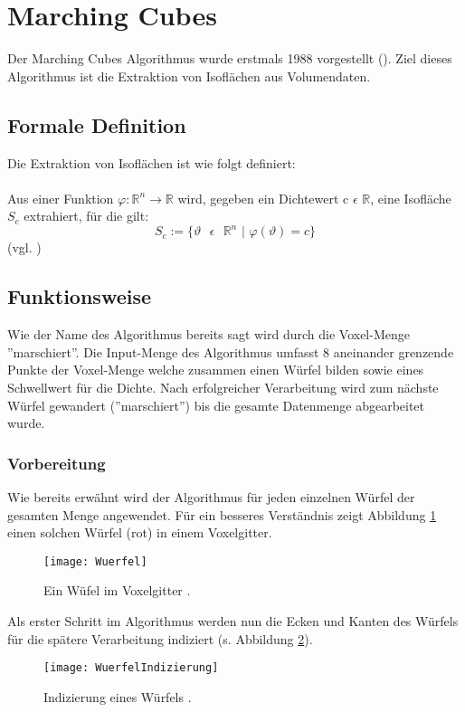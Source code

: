 \section{Marching Cubes}
Der Marching Cubes Algorithmus wurde erstmals 1988 vorgestellt (\citep{MCAlgo}). Ziel dieses Algorithmus ist die Extraktion von Isoflächen aus Volumendaten. 
\subsection{Formale Definition}
Die Extraktion von Isoflächen ist wie folgt definiert: 
\\\\
Aus einer Funktion $\varphi : \mathbb{R}^{n} \rightarrow \mathbb{R }$ wird, gegeben ein Dichtewert   c $\epsilon$ $ \mathbb{ R} $, eine
Isofläche $S_{c}$ extrahiert, für die gilt:
\begin{equation}
S_{c} := \{ \vartheta \text{ } \epsilon \text{ } \mathbb{R}^{n} \text{ | } \varphi(\vartheta) = c\}
\end{equation} 
(vgl. \citep{SeibtBak})

\subsection{Funktionsweise}
Wie der Name des Algorithmus bereits sagt wird durch die Voxel-Menge ''marschiert''. Die Input-Menge des Algorithmus umfasst 8 aneinander grenzende Punkte der Voxel-Menge welche zusammen einen Würfel bilden sowie eines Schwellwert für die Dichte. Nach erfolgreicher Verarbeitung wird zum nächste Würfel gewandert (''marschiert'') bis die gesamte Datenmenge abgearbeitet wurde. 
\subsubsection{Vorbereitung}
Wie bereits erwähnt wird der Algorithmus für jeden einzelnen Würfel der gesamten Menge angewendet. Für ein besseres Verständnis zeigt Abbildung \ref{fig:Wuerfel} einen solchen Würfel (rot) in einem Voxelgitter.
\begin{figure}[H]
	\centering
	\texttt{[image: Wuerfel]}
	\caption{Ein Wüfel im Voxelgitter \citep{SeibtBak}.}
	\label{fig:Wuerfel}
\end{figure}
Als erster Schritt im Algorithmus werden nun die Ecken und Kanten des Würfels für die spätere Verarbeitung indiziert (s. Abbildung \ref{fig:WuerfelIndizierung}).
\begin{figure}[H]
	\centering
	\texttt{[image: WuerfelIndizierung]}
	\caption{Indizierung eines Würfels \citep{SeibtBak}.}
	\label{fig:WuerfelIndizierung}
\end{figure}

